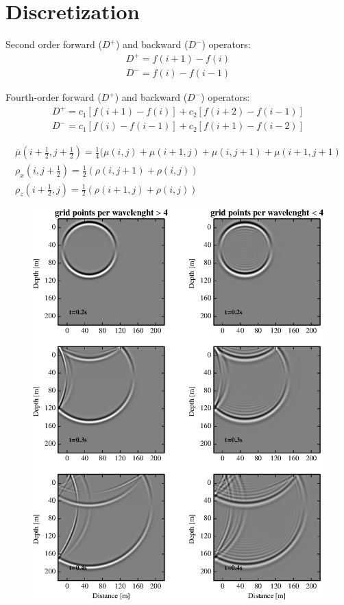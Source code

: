 \documentclass{gnulike}
\begin{document}
\section{Discretization}

\noindent Second order forward ($D^{+}$) and backward ($D^{-}$) operators:
\begin{eqnarray}
  D^{+}=f(i+1)-f(i) \nonumber \\
  D^{-}=f(i)-f(i-1)
\end{eqnarray}

\noindent Fourth-order forward ($D^{+}$) and backward ($D^{-}$) operators:
\begin{eqnarray}
  D^{+}=c_{1}[f(i+1)-f(i)]+c_{2}[f(i+2)-f(i-1)] \nonumber \\
  D^{-}=c_{1}[f(i)-f(i-1)]+c_{2}[f(i+1)-f(i-2)]
\end{eqnarray}


\begin{eqnarray}
  \bar{\mu}(i+\frac{1}{2}, j+\frac{1}{2})=\frac{1}{4}(\mu(i,j)+\mu(i+1,j)+\mu(i,j+1)+\mu(i+1,j+1) \\
  \rho_{x}(i,j+\frac{1}{2}) = \frac{1}{2}(\rho (i,j+1)+\rho(i,j)) \\
  \rho_{z}(i+\frac{1}{2},j) = \frac{1}{2}(\rho (i+1,j)+\rho(i,j))
\end{eqnarray}

\begin{figure}[!ht]
  \centering
  \includegraphics[scale=1.0]{fig/validation_dispersion.eps}
\end{figure}
\end{document}
